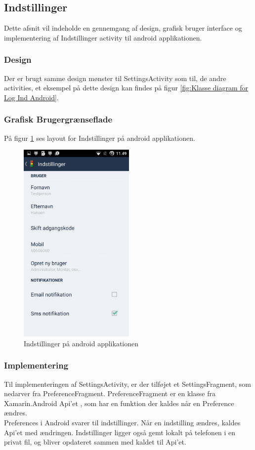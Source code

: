 \pagebreak 
	
	
	\subsection{Indstillinger}
	Dette afsnit vil indeholde en gennemgang af design, grafisk bruger interface og implementering af Indstillinger activity til android applikationen.
	\subsubsection{Design}
	Der er brugt samme design mønster til SettingsActivity som til, de andre activities, et eksempel på dette design kan findes på figur \ref{fig:Klasse diagram for Log Ind Android}.
	
	\subsubsection{Grafisk Brugergrænseflade}
	På figur \ref{fig:Instillinger på android applikationen} ses layout for Indstillinger på android applikationen.	
	\begin{figure} [!ht]
		\begin{center}
			\includegraphics[height=10cm]{Android/Billeder/AndroidInstillinger}
		\end{center}
		\caption{Indstillinger på android applikationen}
		\label{fig:Instillinger på android applikationen}
	\end{figure}
	
	\subsubsection{Implementering}
	Til implementeringen af SettingsActivity, er der tilføjet et SettingsFragment, som nedarver fra PreferenceFragment. PreferenceFragment er en klasse fra Xamarin.Android Api'et \cite{XamarinDoc}, som har en funktion der kaldes når en Preference ændres. 
	\\Preferences i Android svarer til indstillinger. Når en indstilling ændres, kaldes Api'et med ændringen. Indstillinger ligger også gemt lokalt på telefonen i en privat fil, og bliver opdateret sammen med kaldet til Api'et.
	
